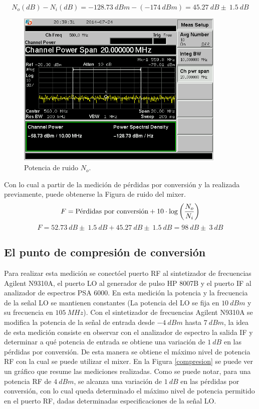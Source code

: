 \documentclass[a4paper,10pt]{article}
\begin{document}
		$$N_o(dB)-N_i(dB)=-128.73~dBm-(-174~dBm)=45.27~dB\pm~1.5~dB$$			
	\begin{figure}[!htb]
		\centering
		\includegraphics[width=10cm]{Images/SCREN542.png}
		\caption{Potencia de ruido $N_o$.}
		\label{noise}
	\end{figure}
		Con lo cual a partir de la medici\'on de p\'erdidas por conversi\'on y la realizada previamente, puede obtenerse la Figura de ruido del mixer.
		$$F=\textmd{P\'erdidas por conversi\'on}+10\cdot\log\left(\frac{N_o}{N_i}\right)$$
		$$F=52.73~dB\pm~1.5~dB+45.27~dB\pm~1.5~dB=98~dB\pm~3~dB$$
	\subsection{El punto de compresi\'on de conversi\'on}
Para realizar esta medici\'on se conect\'oel puerto RF al sintetizador de frecuencias Agilent N9310A, el puerto LO al generador de pulso HP 8007B y el puerto IF al analizador de espectros PSA 6000. En esta medici\'on la potencia y la frecuencia de la se\~nal LO se mantienen constantes (La potencia del LO se fija en $10~dBm$ y su frecuencia en $105~MHz$). Con el sintetizador de frecuencias Agilent N9310A se modifica la potencia de la se\~nal de entrada desde $-4~dBm$ hasta $7~dBm$, la idea de esta medici\'on consiste en observar con el analizador de espectro la salida IF y determinar a qu\'e potencia de entrada se obtiene una variaci\'on de $1~dB$ en las p\'erdidas por conversi\'on. De esta manera se obtiene el m\'aximo nivel de potencia RF con la cual se puede utilizar el mixer.
En la Figura \ref{compresion} se puede ver un gr\'afico que resume las mediciones realizadas. Como se puede notar, para una potencia RF de $4~dBm$, se alcanza una variaci\'on de $1~dB$ en las p\'erdidas por conversi\'on, con lo cual queda determinado el m\'aximo nivel de potencia permitido en el puerto RF, dadas determinadas especificaciones de la se\~nal LO.
	
\end{document}
